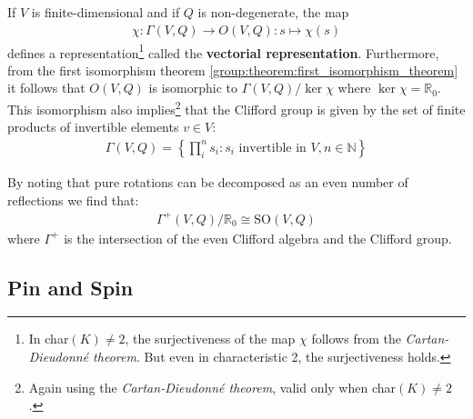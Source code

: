     \begin{property}
        If $V$ is finite-dimensional and if $Q$ is non-degenerate, the map
        \begin{gather}
            \chi:\Gamma(V, Q)\rightarrow O(V, Q): s\mapsto\chi(s)
        \end{gather}
        defines a representation\footnote{In char$(K)\neq2$, the surjectiveness of the map $\chi$ follows from the \textit{Cartan-Dieudonn\'e theorem}. But even in characteristic 2, the surjectiveness holds.} called the \textbf{vectorial representation}. Furthermore, from the first isomorphism theorem \ref{group:theorem:first_isomorphism_theorem} it follows that $O(V, Q)$ is isomorphic to $\Gamma(V, Q)/\ker\chi$ where $\ker\chi = \mathbb{R}_0$. This isomorphism also implies\footnote{Again using the \textit{Cartan-Dieudonn\'e theorem}, valid only when char$(K)\neq2$.} that the Clifford group is given by the set of finite products of invertible elements $v\in V$:
        \begin{gather}
            \Gamma(V, Q) = \left\{\prod_i^n s_i : s_i\text{ invertible in }V, n\in\mathbb{N}\right\}
        \end{gather}
    \end{property}
    \begin{result}
        By noting that pure rotations can be decomposed as an even number of reflections we find that:
        \begin{gather}
            \Gamma^+(V, Q)/\mathbb{R}_0 \cong \text{SO}(V, Q)
        \end{gather}
        where $\Gamma^+$ is the intersection of the even Clifford algebra and the Clifford group.
    \end{result}

\subsection{Pin and Spin}

